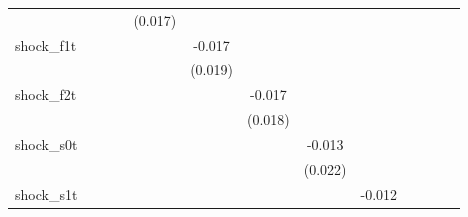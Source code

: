 {\begin{tabular}{l*{12}{c}}
            &                     &                     &                     &     (0.017)         &                     &                     &                     &                     &                     &                     &                     &                     \\
\addlinespace
shock\_f1t   &                     &                     &                     &                     &      -0.017         &                     &                     &                     &                     &                     &                     &                     \\
            &                     &                     &                     &                     &     (0.019)         &                     &                     &                     &                     &                     &                     &                     \\
\addlinespace
shock\_f2t   &                     &                     &                     &                     &                     &      -0.017         &                     &                     &                     &                     &                     &                     \\
            &                     &                     &                     &                     &                     &     (0.018)         &                     &                     &                     &                     &                     &                     \\
\addlinespace
shock\_s0t   &                     &                     &                     &                     &                     &                     &      -0.013         &                     &                     &                     &                     &                     \\
            &                     &                     &                     &                     &                     &                     &     (0.022)         &                     &                     &                     &                     &                     \\
\addlinespace
shock\_s1t   &                     &                     &                     &                     &                     &                     &                     &      -0.012         &                     &                     &                     &                     \\

\end{tabular}}
